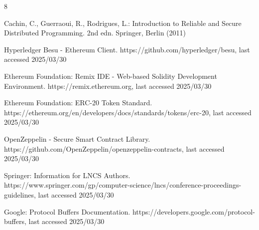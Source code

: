 \documentclass[runningheads]{llncs}
\begin{document}
%
%
% 
% 
%
\begin{thebibliography}{8}

Cachin, C., Guerraoui, R., Rodrigues, L.: Introduction to Reliable and Secure Distributed Programming. 2nd edn. Springer, Berlin (2011)

Hyperledger Besu - Ethereum Client. https://github.com/hyperledger/besu, last accessed 2025/03/30

Ethereum Foundation: Remix IDE - Web-based Solidity Development Environment. https://remix.ethereum.org, last accessed 2025/03/30

Ethereum Foundation: ERC-20 Token Standard. https://ethereum.org/en/developers/docs/standards/tokens/erc-20, last accessed 2025/03/30

OpenZeppelin - Secure Smart Contract Library. https://github.com/OpenZeppelin/openzeppelin-contracts, last accessed 2025/03/30

Springer: Information for LNCS Authors. https://www.springer.com/gp/computer-science/lncs/conference-proceedings-guidelines, last accessed 2025/03/30

Google: Protocol Buffers Documentation. https://developers.google.com/protocol-buffers, last accessed 2025/03/30

\end{thebibliography}
\end{document}
